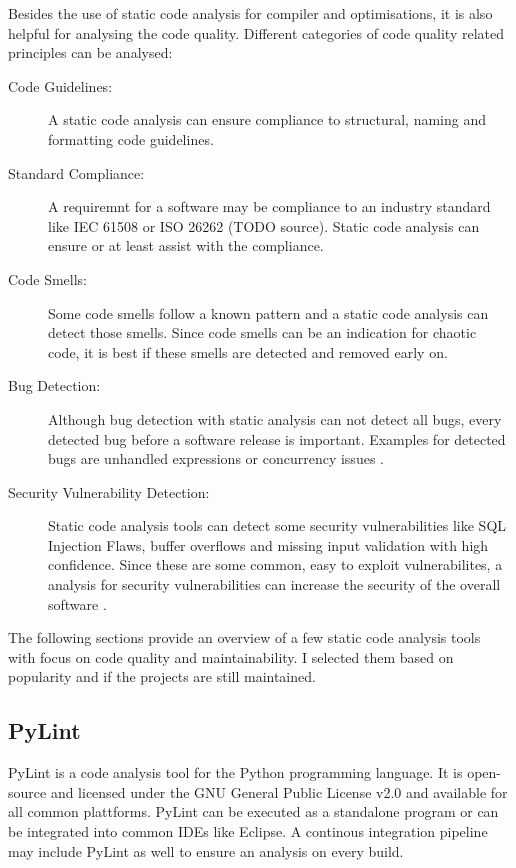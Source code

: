 Besides the use of static code analysis for compiler and optimisations, it is also helpful for analysing the code quality. Different categories of code quality related principles can be analysed:
\begin{description}
    \item[Code Guidelines:] A static code analysis can ensure compliance to structural, naming and formatting code guidelines. 
    \item[Standard Compliance:] A requiremnt for a software may be compliance to an industry standard like IEC 61508 or ISO 26262 (TODO source). Static code analysis can ensure or at least assist with the compliance.   
    \item[Code Smells:] Some code smells follow a known pattern and a static code analysis can detect those smells. Since code smells can be an indication for chaotic code, it is best if these smells are detected and removed early on.
    \item[Bug Detection:] Although bug detection with static analysis can not detect all bugs, every detected bug before a software release is important. Examples for detected bugs are unhandled expressions or concurrency issues \cite{delaitre_evaluating_2015}.
    \item[Security Vulnerability Detection:] Static code analysis tools can detect some security vulnerabilities like SQL Injection Flaws, buffer overflows and missing input validation with high confidence. Since these are some common, easy to exploit vulnerabilites, a analysis for security vulnerabilities can increase the security of the overall software \cite{wichers_source_nodate}.  
\end{description}

The following sections provide an overview of a few static code analysis tools with focus on code quality and maintainability. I selected them based on popularity and if the projects are still maintained.

\subsection{PyLint}
PyLint is a code analysis tool for the Python programming language. It is open-source and licensed under the GNU General Public License v2.0 and available for all common plattforms. PyLint can be executed as a standalone program or can be integrated into common IDEs like Eclipse. A continous integration pipeline may include PyLint as well to ensure an analysis on every build.

